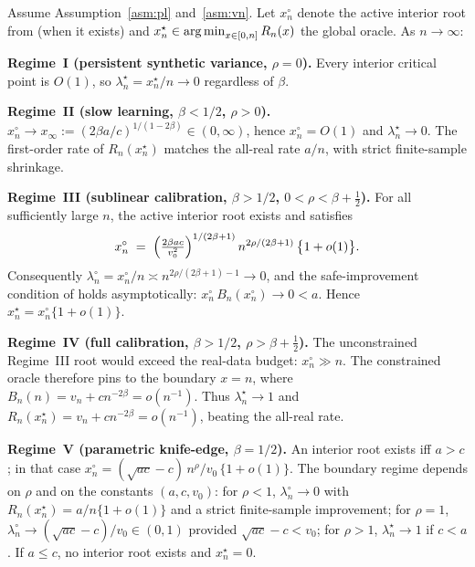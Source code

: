 \begin{theorem}\label{thm:phase}
Assume Assumption~\ref{asm:pl} and~\ref{asm:vn}. Let $x_n^\circ$ denote the active interior root from  (when it exists) and $x_n^\star\in\operatorname*{arg\,min}_{x\in[0,n]}R_n(x)$ the global oracle. As $n\to\infty$:

\smallskip
\noindent\textbf{Regime~I (persistent synthetic variance, $\rho=0$).} Every interior critical point is $O(1)$, so $\lambda_n^\star=x_n^\star/n\to 0$ regardless of $\beta$.

\smallskip
\noindent\textbf{Regime~II (slow learning, $\beta<1/2$, $\rho>0$).} $x_n^\circ\to x_\infty:=(2\beta a/c)^{1/(1-2\beta)}\in(0,\infty)$, hence $x_n^\circ=O(1)$ and $\lambda_n^\star\to 0$. The first-order rate of $R_n(x_n^\star)$ matches the all-real rate $a/n$, with strict finite-sample shrinkage.

\smallskip
\noindent\textbf{Regime~III (sublinear calibration, $\beta>1/2$, $0<\rho<\beta+\tfrac12$).} For all sufficiently large $n$, the active interior root exists and satisfies
\begin{equation}\label{eq:xn-circ-III}
  x_n^\circ\;=\;\Bigl(\tfrac{2\beta ac}{v_0^2}\Bigr)^{1/(2\beta+1)}\,n^{2\rho/(2\beta+1)}\,\bigl\{1+o(1)\bigr\}.
\end{equation}
Consequently $\lambda_n^\circ=x_n^\circ/n\asymp n^{2\rho/(2\beta+1)-1}\to 0$, and the safe-improvement condition of  holds asymptotically: $x_n^\circ\,B_n(x_n^\circ)\to 0<a$. Hence $x_n^\star=x_n^\circ\{1+o(1)\}$.

\smallskip
\noindent\textbf{Regime~IV (full calibration, $\beta>1/2$, $\rho>\beta+\tfrac12$).} The unconstrained Regime~III root would exceed the real-data budget: $x_n^\circ\gg n$. The constrained oracle therefore pins to the boundary $x=n$, where $B_n(n)=v_n+cn^{-2\beta}=o(n^{-1})$. Thus $\lambda_n^\star\to 1$ and $R_n(x_n^\star)=v_n+cn^{-2\beta}=o(n^{-1})$, beating the all-real rate.

\smallskip
\noindent\textbf{Regime~V (parametric knife-edge, $\beta=1/2$).} An interior root exists iff $a>c$; in that case $x_n^\circ=(\sqrt{ac}-c)\,n^\rho/v_0\,\{1+o(1)\}$. The boundary regime depends on $\rho$ and on the constants $(a,c,v_0)$: for $\rho<1$, $\lambda_n^\circ\to 0$ with $R_n(x_n^\star)=a/n\{1+o(1)\}$ and a strict finite-sample improvement; for $\rho=1$, $\lambda_n^\circ\to(\sqrt{ac}-c)/v_0\in(0,1)$ provided $\sqrt{ac}-c<v_0$; for $\rho>1$, $\lambda_n^\star\to 1$ if $c<a$. If $a\le c$, no interior root exists and $x_n^\star=0$.
\end{theorem}

